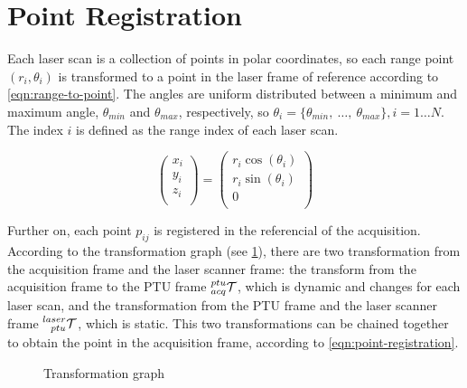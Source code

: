\section{Point Registration}
\label{section:point-registration}

Each laser scan is a collection of points in polar coordinates, so each range point $(r_i, \theta_i)$ is transformed to a point in the laser frame of reference according to \cref{eqn:range-to-point}. The angles are uniform distributed between a minimum and maximum angle, $\theta_{min}$ and $\theta_{max}$, respectively, so $\theta_i = \{\theta_{min}, \ \dots, \ \theta_{max}\}, i=1 \dots N$. The index $i$ is defined as the range index of each laser scan.

\begin{equation}\label{eqn:range-to-point}
    \left(
        \begin{array}{c}
            x_i \\
            y_i \\
            z_i \\
        \end{array}
    \right)
    =
    \left(
        \begin{array}{c}
            r_i \cos(\theta_i) \\
            r_i \sin(\theta_i) \\
            0 \\
        \end{array}    
    \right)
\end{equation}

Further on, each point $p_{ij}$ is registered in the referencial of the acquisition. According to the transformation graph (see \cref{figure:geometric-transformation-graph}), there are two transformation from the acquisition frame and the laser scanner frame: the transform from the acquisition frame to the PTU frame $\TF{acq}{ptu}$, which is dynamic and changes for each laser scan, and the transformation from the PTU frame and the laser scanner frame $\TF{ptu}{laser}$, which is static. This two transformations can be chained together to obtain the point in the acquisition frame, according to \cref{eqn:point-registration}.


\begin{figure}
    
    \centering
    
    \caption{Transformation graph}
    \label{figure:geometric-transformation-graph}
\end{figure}

